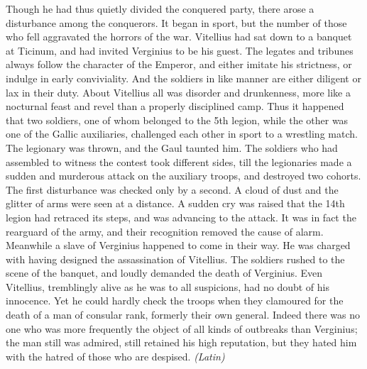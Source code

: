 
Though he had thus quietly divided the conquered party, there arose a disturbance among the conquerors. It began in sport, but the number of those who fell aggravated the horrors of the war. Vitellius had sat down to a banquet at Ticinum, and had invited Verginius to be his guest. The legates and tribunes always follow the character of the Emperor, and either imitate his strictness, or indulge in early conviviality. And the soldiers in like manner are either diligent or lax in their duty. About Vitellius all was disorder and drunkenness, more like a nocturnal feast and revel than a properly disciplined camp. Thus it happened that two soldiers, one of whom belonged to the 5th legion, while the other was one of the Gallic auxiliaries, challenged each other in sport to a wrestling match. The legionary was thrown, and the Gaul taunted him. The soldiers who had assembled to witness the contest took different sides, till the legionaries made a sudden and murderous attack on the auxiliary troops, and destroyed two cohorts. The first disturbance was checked only by a second. A cloud of dust and the glitter of arms were seen at a distance. A sudden cry was raised that the 14th legion had retraced its steps, and was advancing to the attack. It was in fact the rearguard of the army, and their recognition removed the cause of alarm. Meanwhile a slave of Verginius happened to come in their way. He was charged with having designed the assassination of Vitellius. The soldiers rushed to the scene of the banquet, and loudly demanded the death of Verginius. Even Vitellius, tremblingly alive as he was to all suspicions, had no doubt of his innocence. Yet he could hardly check the troops when they clamoured for the death of a man of consular rank, formerly their own general. Indeed there was no one who was more frequently the object of all kinds of outbreaks than Verginius; the man still was admired, still retained his high reputation, but they hated him with the hatred of those who are despised. \emph{(Latin)}


